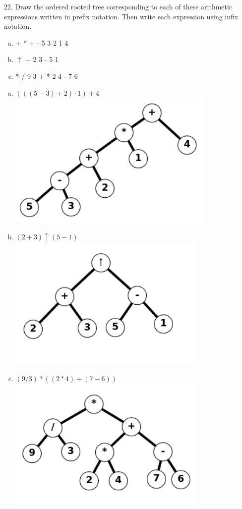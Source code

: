 \begin{itemize}
\item[22.]  Draw the ordered rooted tree corresponding to each of
these arithmetic expressions written in prefix notation.
Then write each expression using infix notation.
\begin{enumerate}[a.]
\item + * + - 5 3 2 1 4
\item $\uparrow$ + 2 3 - 5 1
\item * / 9 3 + * 2 4 - 7 6
\end{enumerate}
\answer
\begin{enumerate}[a.]
    \item $(((5-3) + 2) \cdot 1) + 4 $ \\
    \includegraphics[]{img/11_3_22a_tree.png}
    \item $(2+3) \uparrow (5-1) $ \\
    \includegraphics[]{img/11_3_22b_tree.png}
    \item $(9/3)*((2*4)+(7-6))$ \\
    \includegraphics[]{img/11_3_22c_tree.png}
\end{enumerate}


\end{itemize}
